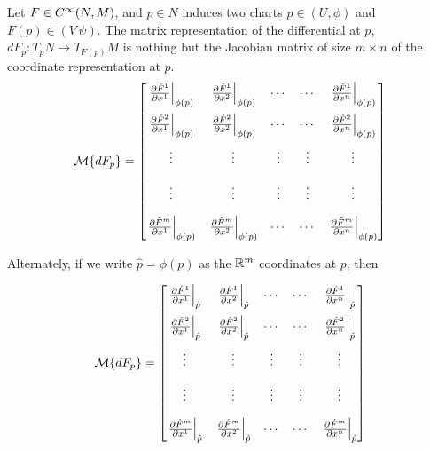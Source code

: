 \documentclass[../main-manifolds.tex]{subfiles}
\begin{document}
\begin{wts}
Let $F\in \cinf[N,M]$, and $p\in N$ induces two charts $p\in (U,\phi)$ and $F(p)\in(V\,\psi)$. The matrix representation of the differential at $p$, $dF_p: T_p N\to T_{F(p)}M$ is nothing but the Jacobian matrix of size $m\times n$ of the coordinate representation at $p$.
\begin{equation}\label{lee-chap3:jacobian-matrix-representation}
        \mcal\{dF_p\} = \begin{bmatrix}\eval{\pdv{\hat{F}^1}{x^1}}_{\phi(p)} & \eval{\pdv{\hat{F}^1}{x^2}}_{\phi(p)} & \cdots & \cdots & \eval{\pdv{\hat{F}^1}{x^n}}_{\phi(p)} \\[1em] \eval{\pdv{\hat{F}^2}{x^1}}_{\phi(p)} & \eval{\pdv{\hat{F}^2}{x^2}}_{\phi(p)} & \cdots & \cdots & \eval{\pdv{\hat{F}^2}{x^n}}_{\phi(p)} \\[1em] \vdots & \vdots & \vdots & \vdots & \vdots \\[1em] \vdots & \vdots & \vdots & \vdots & \vdots \\[1em] \eval{\pdv{\hat{F}^m}{x^1}}_{\phi(p)} & \eval{\pdv{\hat{F}^m}{x^2}}_{\phi(p)} & \cdots & \cdots & \eval{\pdv{\hat{F}^m}{x^n}}_{\phi(p)}\end{bmatrix}
\end{equation}

Alternately, if we write $\hat{p} = \phi(p)$ as the ${\mathbb{R}^m}$ coordinates at $p$, then

\begin{equation}\label{lee-chap3:jacobian-matrix-representation-alternate}
        \mcal\{dF_p\} = \begin{bmatrix}\eval{\pdv{\hat{F}^1}{x^1}}_{\hat{p}} & \eval{\pdv{\hat{F}^1}{x^2}}_{\hat{p}} & \cdots & \cdots & \eval{\pdv{\hat{F}^1}{x^n}}_{\hat{p}} \\[1em] \eval{\pdv{\hat{F}^2}{x^1}}_{\hat{p}} & \eval{\pdv{\hat{F}^2}{x^2}}_{\hat{p}} & \cdots & \cdots & \eval{\pdv{\hat{F}^2}{x^n}}_{\hat{p}} \\[1em] \vdots & \vdots & \vdots & \vdots & \vdots \\[1em] \vdots & \vdots & \vdots & \vdots & \vdots \\[1em] \eval{\pdv{\hat{F}^m}{x^1}}_{\hat{p}} & \eval{\pdv{\hat{F}^m}{x^2}}_{\hat{p}} & \cdots & \cdots & \eval{\pdv{\hat{F}^m}{x^n}}_{\hat{p}}\end{bmatrix}
\end{equation}
\end{wts}
\end{document}
